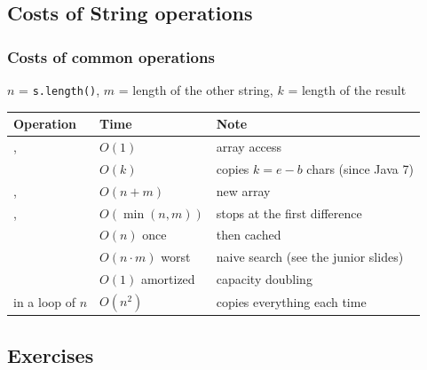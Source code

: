 \documentclass[aspectratio=169,10pt,compress]{beamer}
\begin{document}

\subsection[Costs]{Costs of String operations}




\begin{frame}[t,fragile] \frametitle{Costs of common operations}
  \small $n$ = \texttt{s.length()}, $m$ = length of the other string, $k$ = length of the result
  \vspace{0.3em}

  \begin{tabular}{@{}L{0.36\textwidth}L{0.17\textwidth}L{0.38\textwidth}@{}}
    \toprule
    \textbf{Operation} & \textbf{Time} & \textbf{Note} \\
    \midrule
    ,        & $O(1)$        & array access \\
                        & $O(k)$        & copies $k = e - b$ chars (since Java 7) \\
    ,              & $O(n + m)$    & new array \\
    ,          & $O(\min(n, m))$ & stops at the first difference \\
                             & $O(n)$ once   & then cached \\
                             & $O(n \cdot m)$ worst & naive search (see the junior slides) \\
                           & $O(1)$ amortized & capacity doubling \\
     in a loop of $n$            & $O(n^{2})$    & copies everything each time \\
    \bottomrule
  \end{tabular}
\end{frame}

\subsection[Exercises]{Exercises}
\end{document}
